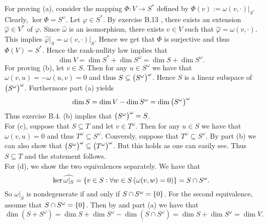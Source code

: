 \begin{solution}
For proving (a), consider the mapping $\Phi : V \to S^*$ defined by $\Phi(v) := \omega(v,\cdot)\vert_S$. Clearly, $\ker \Phi = S^\omega$. Let $\varphi \in S^*$. By exercise B.13 \cite[623]{lee:smooth_manifolds:2013}, there exists an extension $\widehat{\varphi} \in V^*$ of $\varphi$. Since $\widehat{\omega}$ is an isomorphism, there exists $v \in V$ such that $\widehat{\varphi} = \omega(v,\cdot)$. This implies $\widehat{\varphi}\vert_S = \omega(v,\cdot)\vert_S$. Hence we get that $\Phi$ is surjective and thus $\Phi(V) = S^*$. Hence the rank-nullity law \cite[627]{lee:smooth_manifolds:2013} implies that 
\begin{equation*}
\dim V = \dim S^* + \dim S^\omega = \dim S + \dim S^\omega.
\end{equation*}
For proving (b), let $v \in S$. Then for any $u \in S^\omega$ we have that $\omega(v,u) = - \omega(u,v) = 0$ and thus $S \subseteq \del[1]{S^\omega}^\omega$. Hence $S$ is a linear subspace of $\del[1]{S^\omega}^\omega$. Furthermore part (a) yields
\begin{equation*}
\dim S = \dim V - \dim S^\omega = \dim \del[1]{S^\omega}^\omega
\end{equation*}
\noindent Thus exercise B.4. (b) \cite[620]{lee:smooth_manifolds:2013} implies that $\del[1]{S^\omega}^\omega = S$.\\
For (c), suppose that $S \subseteq T$ and let $v \in T^\omega$. Then for any $u \in S$ we have that $\omega(v,u) = 0$ and thus $T^\omega \subseteq S^\omega$. Conversly, suppose that $T^\omega \subseteq S^\omega$. By part (b) we can also show that $\del[1]{S^\omega}^\omega \subseteq \del[1]{T^\omega}^\omega$. But this holds as one can easily see. Thus $S \subseteq T$ and the statement follows.\\
For (d), we show the two equivalences separately. We have that
\begin{equation*}
\ker \widehat{\omega\vert_{S}} = \cbr[0]{v \in S : \forall w \in S\del[0]{\omega(v,w) = 0}} = S \cap S^\omega.
\end{equation*}
So $\omega\vert_{S}$ is nondegenerate if and only if $S \cap S^\omega = \cbr[0]{0}$. For the second equivalence, assume that $S \cap S^\omega = \cbr[0]{0}$. Then by \cite[100]{fischer:lineare_algebra:2014} and part (a) we have that
\begin{equation*}
\dim(S + S^\omega) = \dim S + \dim S^\omega - \dim(S \cap S^\omega) = \dim S + \dim S^\omega = \dim V.
\end{equation*}

\end{solution}
